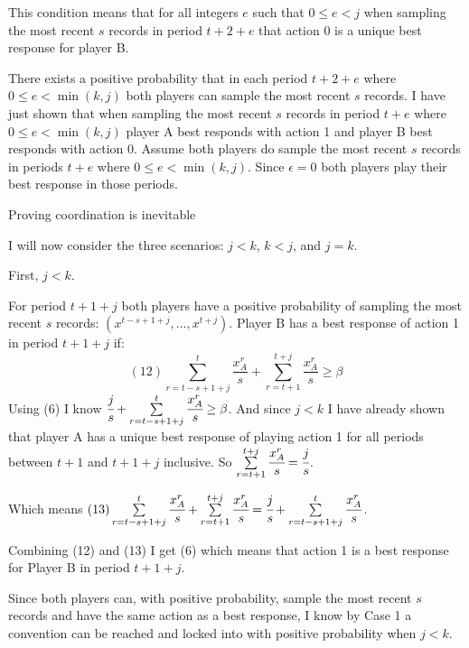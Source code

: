 \documentclass{article}
\begin{document}
This condition means that for all integers $e$ such that $0 \leq e<j$ when sampling the most recent $s$ records in period $t+2+e$ that action 0 is a unique best response for player B.

\vskip12pt

There exists a positive probability that in each period $t+2+e$ where $0 \leq e<\min (k,j)$ both players can sample the most recent $s$ records. I have just shown that when sampling the most recent $s$ records in period $t+e$ where $0 \leq e<\min (k,j)$ player A best responds with action 1 and player B best responds with action 0. Assume both players do sample the most recent $s$ records in periods $t+e$ where $0 \leq e<\min (k,j)$. Since $\epsilon=0$ both players play their best response in those periods.

\vskip12pt

\centering

Proving coordination is inevitable

\vskip6pt

\raggedright

I will now consider the three scenarios: $j<k$, $k<j$, and $j=k$.

\vskip12pt

First, $j<k$. 

\vskip6pt

For period $t+1+j$ both players have a positive probability of sampling the most recent $s$ records: $(x^{t-s+1+j},...,x^{t+j})$. Player B has a best response of action 1 in period $t+1+j$ if:
$$(12) \sum\limits_{r=t-s+1+j}^{t}\frac{x^r_A}{s}+\sum\limits_{r=t+1}^{t+j} \frac{x^r_A}{s} \geq \beta$$
Using (6) I know $\cfrac{j}{s}+\sum\limits_{r=t-s+1+j}^{t}\cfrac{x^r_A}{s} \geq \beta$. And since $j<k$ I have already shown that player A has a unique best response of playing action 1 for all periods between $t+1$ and $t+1+j$ inclusive. So $\sum\limits_{r=t+1}^{t+j} \cfrac{x^r_A}{s}=\cfrac{j}{s}$.

Which means $(13) \sum\limits_{r=t-s+1+j}^{t}\cfrac{x^r_A}{s}+\sum\limits_{r=t+1}^{t+j} \cfrac{x^r_A}{s}=\cfrac{j}{s}+\sum\limits_{r=t-s+1+j}^{t}\cfrac{x^r_A}{s}$.

Combining (12) and (13) I get (6) which means that action 1 is a best response for Player B in period $t+1+j$.

\vskip6pt

Since both players can, with positive probability, sample the most recent $s$ records and have the same action as a best response, I know by Case 1 a convention can be reached and locked into with positive probability when $j<k$.
\end{document}
